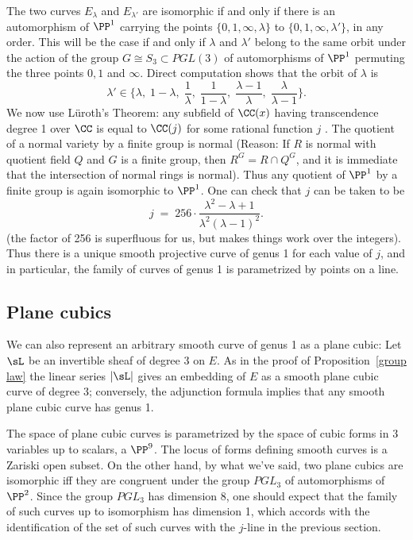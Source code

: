 The two curves $E_\lambda$ and $E_{\lambda'}$ are isomorphic if and only if there is an automorphism of $\PP^1$ carrying the points $\{0,1,\infty,\lambda\}$ to $\{0,1,\infty,\lambda'\}$, in any order. This will be the case if and only if $\lambda$ and $\lambda'$ belong to the same orbit under the action of the group $G \cong S_3 \subset PGL(3)$ of automorphisms of $\PP^1$ permuting the three points $0, 1$ and $\infty$. Direct computation shows that the orbit of $\lambda$ is
$$
\lambda' \in \{\lambda, \; 1-\lambda, \; \frac{1}{\lambda},\;  \frac{1}{1-\lambda}, \; \frac{\lambda - 1}{\lambda}, \; \frac{\lambda}{\lambda - 1} \}.
$$
We now use L\"uroth's Theorem: any subfield of $\CC(x)$ having transcendence degree 1 over $\CC$ is equal to $\CC(j)$ for some rational function $j$ .
The quotient of a normal variety by a finite group is normal (Reason: If $R$ is normal  with quotient field $Q$ and $G$ is a finite group,
then $R^G = R\cap Q^G$, and it is immediate that the intersection of normal rings is normal). Thus any quotient of $\PP^1$ by a finite group is again isomorphic to $\PP^1$.
One can check that $j$ can be taken to be
$$
j \; = \; 256\cdot \frac{\lambda^2 - \lambda + 1}{\lambda^2(\lambda - 1)^2}.
$$
(the factor of 256 is superfluous for us, but makes things work over the integers). Thus there is a unique smooth projective curve of genus 1 for each value of $j$, and in particular, the family of
curves of genus 1 is parametrized by points on a line.

\subsection{Plane cubics}

We can also represent an arbitrary smooth curve of genus 1 as a plane cubic:
Let $\sL$ be an invertible sheaf of degree 3 on $E$. As in the proof of Proposition~\ref{group law} the linear series $|\sL|$ gives an embedding of $E$ as a smooth plane cubic curve of degree 3; conversely, the adjunction formula implies that any smooth plane cubic curve has genus 1. 

The space of plane cubic curves is parametrized by the space of cubic forms in 3 variables up to 
scalars, a  $\PP^9$. The locus of forms defining smooth curves is a Zariski open subset. On the other hand, by what we've said, two plane cubics are isomorphic iff they are congruent under the group $PGL_3$ of automorphisms of $\PP^2$. Since the group $PGL_3$ has dimension 8, one should expect that the family of such curves up to isomorphism has dimension 1, which accords with the identification of the set of such
curves with the $j$-line in the previous section.



